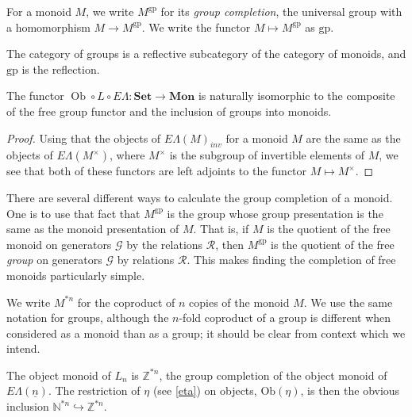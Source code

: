 \documentclass{amsbook} %
\newcommand{\mb}{\mathbf}
\newcommand{\Set}{\mb{Set}}
\newcommand{\EL}{E\Lambda}
\newcommand{\ELn}{E\Lambda(\underline{n})}
\newcommand{\ob}{\operatorname{Ob}}
\newcommand{\sets}{\Set}
\newcommand{\mon}{\ensuremath{\mb{Mon}}}
\numberwithin{section}{chapter}
\begin{document}
\begin{Defi} For a monoid $M$, we write $M^{\mathrm{gp}}$ for its \emph{group completion}, the universal group with a homomorphism $M \to M^{\mathrm{gp}}$.  We write the functor $M \mapsto M^{\mathrm{gp}}$ as $\mathrm{gp}$.
\end{Defi}

\begin{rem}
The category of groups is a reflective subcategory of the category of monoids, and $\mathrm{gp}$ is the reflection.
\end{rem}

\begin{prop}\label{oblel_fg}
The functor $\ob \circ L \circ \EL \colon  \sets \to \mon$ is naturally isomorphic to the composite of the free group functor and the inclusion of groups into monoids.
\end{prop}
\begin{proof}
Using that the objects of $\EL(M)_{inv}$ for a monoid $M$ are the same as the objects of $\EL(M^{\times})$, where $M^{\times}$ is the subgroup of invertible elements of $M$, we see that both of these functors are left adjoints to the functor $M \mapsto M^{\times}$.
\end{proof}
There are several different ways to calculate the group completion of a monoid. One is to use that fact that $M^{\mathrm{gp}}$ is the group whose group presentation is the same as the monoid presentation of $M$. That is, if $M$ is the quotient of the free monoid on generators $\mathcal{G}$ by the relations $\mathcal{R}$, then $M^{\mathrm{gp}}$ is the quotient of the free \emph{group} on generators $\mathcal{G}$ by relations $\mathcal{R}$. This makes finding the completion of free monoids particularly simple.

\begin{nota}
We write $M^{*n}$ for the coproduct of $n$ copies of the monoid $M$. We use the same notation for groups, although the $n$-fold coproduct of a group is different when considered as a monoid than as a group; it should be clear from context which we intend.
\end{nota}

\begin{cor}\label{Zobj}
The object monoid of $L_n$ is $\mathbb{Z}^{*n}$, the group completion of the object monoid of $\ELn$. The restriction of $\eta$ (see \cref{eta}) on objects, $\mathrm{Ob}(\eta)$, is then the obvious inclusion $\mathbb{N}^{*n} \hookrightarrow \mathbb{Z}^{*n}$.
\end{cor}
\end{document}
